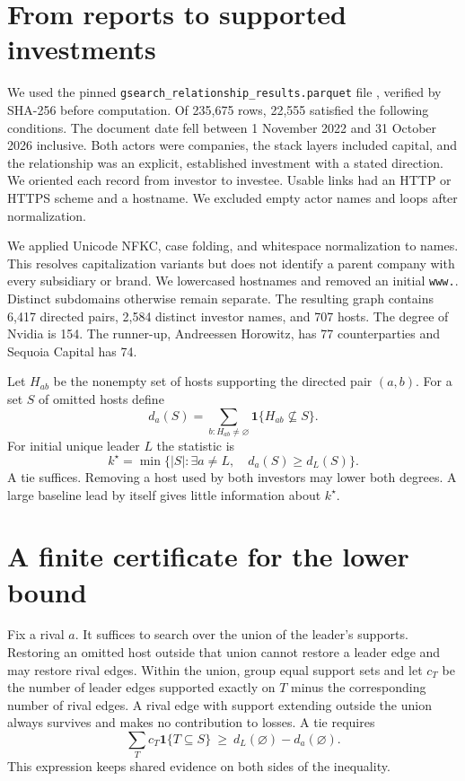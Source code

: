 \documentclass[11pt]{article}
\begin{document}
\newpage
\section{From reports to supported investments}
We used the pinned \texttt{gsearch\_relationship\_results.parquet} file \cite{data}, verified by SHA-256 before computation. Of 235,675 rows, 22,555 satisfied the following conditions. The document date fell between 1 November 2022 and 31 October 2026 inclusive. Both actors were companies, the stack layers included capital, and the relationship was an explicit, established investment with a stated direction. We oriented each record from investor to investee. Usable links had an HTTP or HTTPS scheme and a hostname. We excluded empty actor names and loops after normalization.

We applied Unicode NFKC, case folding, and whitespace normalization to names. This resolves capitalization variants but does not identify a parent company with every subsidiary or brand. We lowercased hostnames and removed an initial \texttt{www.}. Distinct subdomains otherwise remain separate. The resulting graph contains 6,417 directed pairs, 2,584 distinct investor names, and 707 hosts. The degree of Nvidia is 154. The runner-up, Andreessen Horowitz, has 77 counterparties and Sequoia Capital has 74.

Let $H_{ab}$ be the nonempty set of hosts supporting the directed pair $(a,b)$. For a set $S$ of omitted hosts define
\[
 d_a(S)=\sum_{b:H_{ab}\ne\varnothing}\mathbf{1}\{H_{ab}\not\subseteq S\}.
\]
For initial unique leader $L$ the statistic is
\[
 k^\star=\min\bigl\{|S|:\exists a\ne L,\quad d_a(S)\ge d_L(S)\bigr\}.
\]
A tie suffices. Removing a host used by both investors may lower both degrees. A large baseline lead by itself gives little information about $k^\star$.

\section{A finite certificate for the lower bound}
Fix a rival $a$. It suffices to search over the union of the leader's supports. Restoring an omitted host outside that union cannot restore a leader edge and may restore rival edges. Within the union, group equal support sets and let $c_T$ be the number of leader edges supported exactly on $T$ minus the corresponding number of rival edges. A rival edge with support extending outside the union always survives and makes no contribution to losses. A tie requires
\[
 \sum_T c_T\mathbf{1}\{T\subseteq S\}\ \ge\ d_L(\varnothing)-d_a(\varnothing).
\]
This expression keeps shared evidence on both sides of the inequality.
\end{document}
